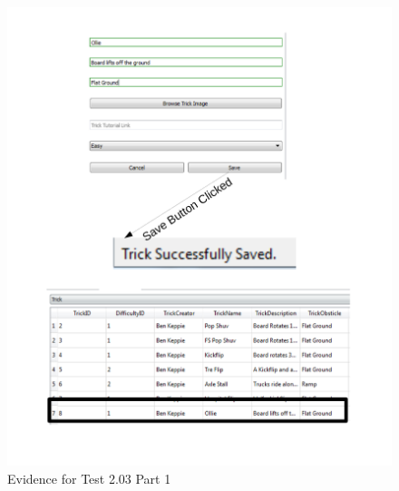 \begin{figure}[H]
    \includegraphics[width=\textwidth]{./Testing/AnnotatedSamples/Test203p1.pdf}
    \caption{Evidence for Test 2.03 Part 1} \label{fig:Test 2.03 p1}
\end{figure}

